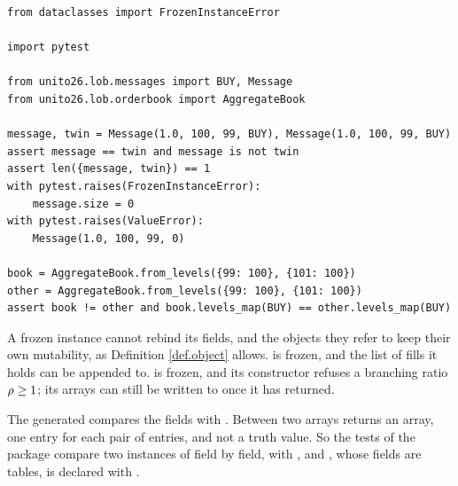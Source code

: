 \begin{lstlisting}[caption={A frozen data class is a value, and a plain class is not.}, label=listing.messageValue]
from dataclasses import FrozenInstanceError

import pytest

from unito26.lob.messages import BUY, Message
from unito26.lob.orderbook import AggregateBook

message, twin = Message(1.0, 100, 99, BUY), Message(1.0, 100, 99, BUY)
assert message == twin and message is not twin
assert len({message, twin}) == 1
with pytest.raises(FrozenInstanceError):
    message.size = 0
with pytest.raises(ValueError):
    Message(1.0, 100, 99, 0)

book = AggregateBook.from_levels({99: 100}, {101: 100})
other = AggregateBook.from_levels({99: 100}, {101: 100})
assert book != other and book.levels_map(BUY) == other.levels_map(BUY)
\end{lstlisting}

\begin{remark}\label{remark.frozenIsShallow}
 A frozen instance cannot rebind its fields,
 and the objects they refer to keep their own mutability,
 as Definition \ref{def.object} allows.
  is frozen, and the list of fills it holds can be appended to.
  is frozen,
 and its constructor refuses a branching ratio $\rho \geq 1$;
 its arrays can still be written to once it has returned.
\end{remark}

\begin{remark}\label{remark.equalityOfArrays}
 The generated  compares the fields with \codehl{==}.
 Between two arrays \codehl{==} returns an array, one entry for each pair of entries,
 and not a truth value.
 So the tests of the package compare two instances of 
 field by field, with ,
 and , whose fields are tables, is declared with .
\end{remark}
